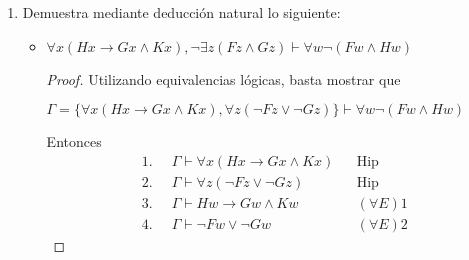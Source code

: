 \documentclass[letterpaper,11pt]{article}
\begin{document}
\begin{enumerate}
        \newpage
        \item Demuestra mediante deducción natural lo siguiente:
        \begin{itemize}
            \item $\forall x (Hx \rightarrow Gx \land Kx), 
            \neg \exists z(Fz \land Gz) \vdash \forall w \neg (Fw \land Hw)$
            \begin{proof}
                Utilizando equivalencias lógicas, basta mostrar que 
                \begin{center}
                    $\Gamma = \{\forall x (Hx \rightarrow Gx \land Kx), 
                    \forall z (\neg Fz \lor \neg Gz)\} \vdash \forall w 
                    \neg (Fw \land Hw)$
                \end{center}
                Entonces 
                \begin{align*}
                    1.\; \; &\Gamma \vdash \forall x (Hx \rightarrow Gx \land Kx)
                    && \text{Hip} \\
                    2. \; \; &\Gamma \vdash \forall z (\neg Fz \lor \neg Gz)
                    && \text{Hip} \\
                    3. \; \; &\Gamma \vdash Hw \rightarrow Gw \land Kw
                    && \text{$(\forall E) 1$} \\
                    4. \; \; &\Gamma \vdash \neg Fw \lor \neg Gw
                    && \text{$(\forall E) 2$}  
                \end{align*}


\end{proof}
\end{itemize}
\end{enumerate}
\end{document}

